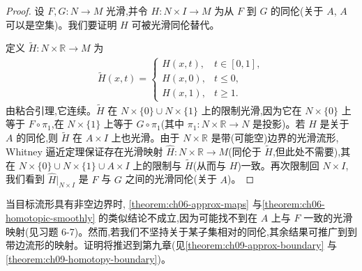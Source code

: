 \documentclass[../../main.tex]{subfiles}
\begin{document}
\begin{proof}
设 $F,G:N\to M$ 光滑,并令 $H:N\times I\to M$ 为从 $F$ 到 $G$ 的同伦(关于 $A$, $A$ 可以是空集)。我们要证明 $H$ 可被光滑同伦替代。

定义 $\widetilde{H}:N\times\mathbb{R}\to M$ 为
\begin{align*}
\widetilde{H}(x,t)=
\begin{cases}
H(x,t), & t\in[0,1],\\
H(x,0), & t\leqslant 0,\\
H(x,1), & t\geqslant 1.
\end{cases}
\end{align*}
由粘合引理,它连续。$\widetilde{H}$ 在 $N\times\{0\}\cup N\times\{1\}$ 上的限制光滑,因为它在 $N\times\{0\}$ 上等于 $F\circ\pi_1$,在 $N\times\{1\}$ 上等于 $G\circ\pi_1$(其中 $\pi_1:N\times\mathbb{R}\to N$ 是投影)。若 $H$ 是关于 $A$ 的同伦,则 $\widetilde{H}$ 在 $A\times I$ 上也光滑。由于 $N\times\mathbb{R}$ 是带(可能空)边界的光滑流形, Whitney 逼近定理保证存在光滑映射 $\widehat{H}:N\times\mathbb{R}\to M$(同伦于 $\widetilde{H}$,但此处不需要),其在 $N\times\{0\}\cup N\times\{1\}\cup A\times I$ 上的限制与 $\widetilde{H}$(从而与 $H$)一致。再次限制回 $N\times I$,我们看到 $\widehat{H}|_{N\times I}$ 是 $F$ 与 $G$ 之间的光滑同伦(关于 $A$)。
\end{proof}

当目标流形具有非空边界时, \cref{theorem:ch06-approx-maps} 与\cref{theorem:ch06-homotopic-smoothly} 的类似结论不成立,因为可能找不到在 $A$ 上与 $F$ 一致的光滑映射(见习题 6-7)。然而,若我们不坚持关于某子集相对的同伦,其余结果可推广到到带边流形的映射。证明将推迟到第九章(见\cref{theorem:ch09-approx-boundary} 与\cref{theorem:ch09-homotopy-boundary})。
\end{document}
